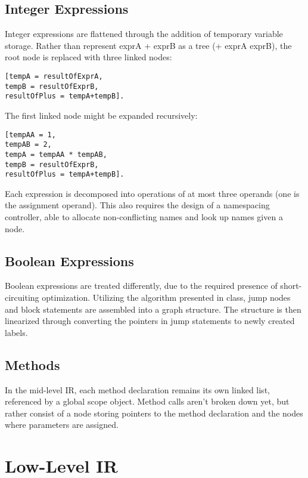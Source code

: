 \documentclass[12pt]{article}
\begin{document}
\subsection{Integer Expressions}
Integer expressions are flattened through the addition of temporary variable storage. Rather than
represent exprA + exprB as a tree (+ exprA exprB), the root node is replaced with three linked
nodes:
\begin{verbatim}
[tempA = resultOfExprA,
tempB = resultOfExprB,
resultOfPlus = tempA+tempB].
\end{verbatim}

The first linked node might be expanded recursively:

\begin{verbatim}
[tempAA = 1,
tempAB = 2,
tempA = tempAA * tempAB,
tempB = resultOfExprB,
resultOfPlus = tempA+tempB].
\end{verbatim}

Each expression is decomposed into operations of at most three operands (one is the assignment
operand). This also requires the design of a namespacing controller, able to allocate
non-conflicting names and look up names given a node.

\subsection{Boolean Expressions}

Boolean expressions are treated differently, due to the required presence of short-circuiting
optimization. Utilizing the algorithm presented in class, jump nodes and block statements are
assembled into a graph structure. The structure is then linearized through converting the pointers
in jump statements to newly created labels.

\subsection{Methods}

In the mid-level IR, each method declaration remains its own linked list, referenced by a global
scope object. Method calls aren’t broken down yet, but rather consist of a node storing pointers to
the method declaration and the nodes where parameters are assigned.

\section{Low-Level IR}
\end{document}

